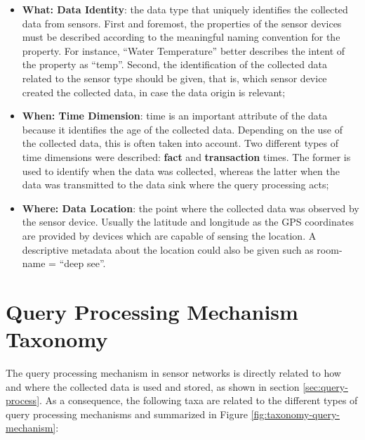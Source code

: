 \begin{itemize}
  \item \textbf{What: Data Identity}: the data type that uniquely identifies
  the collected data from sensors. First and foremost, the properties of the
  sensor devices must be described according to the meaningful naming
  convention for the property. For instance, ``Water Temperature'' better
  describes the intent of the property as ``temp''. Second, the identification
  of the collected data related to the sensor type should be given, that is,
  which sensor device created the collected data, in case the data origin is
  relevant;
  \item \textbf{When: Time Dimension}: time is an important attribute of the
  data because it identifies the age of the collected data. Depending on the 
  use of the collected data, this is often taken into account. Two different
  types of time dimensions were described: \textbf{fact} and
  \textbf{transaction} times. The former is used to identify when the data
  was collected, whereas the latter when the data was transmitted to the
  data sink where the query processing acts;
  \item \textbf{Where: Data Location}: the point where the collected data was
  observed by the sensor device. Usually the latitude and longitude as the GPS
  coordinates are provided by devices which are capable of sensing the
  location. A descriptive metadata about the location could also be given such
  as room-name = ``deep see''.
\end{itemize}

\section{Query Processing Mechanism Taxonomy}

The query processing mechanism in sensor networks is directly related to how
and where the collected data is used and stored, as shown in section
\ref{sec:query-process}. As a consequence, the following taxa are related to the
different types of query processing mechanisms and summarized in Figure
\ref{fig:taxonomy-query-mechanism}:

